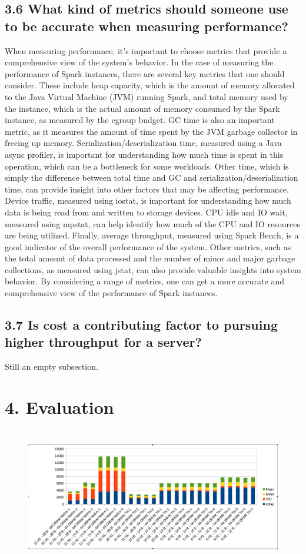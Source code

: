 \documentclass[twocolumn,10pt]{asme2e}
\begin{document}
\subsection*{3.6 What kind of metrics should someone use to be accurate when measuring performance?}
When measuring performance, it's important to choose metrics that provide a comprehensive view of the system's behavior. In the case of measuring the performance of Spark instances, there are several key metrics that one should consider. These include heap capacity, which is the amount of memory allocated to the Java Virtual Machine (JVM) running Spark, and total memory used by the instance, which is the actual amount of memory consumed by the Spark instance, as measured by the cgroup budget. GC time is also an important metric, as it measures the amount of time spent by the JVM garbage collector in freeing up memory. Serialization/deserialization time, measured using a Java async profiler, is important for understanding how much time is spent in this operation, which can be a bottleneck for some workloads. Other time, which is simply the difference between total time and GC and serialization/deserialization time, can provide insight into other factors that may be affecting performance. Device traffic, measured using iostat, is important for understanding how much data is being read from and written to storage devices. CPU idle and IO wait, measured using mpstat, can help identify how much of the CPU and IO resources are being utilized. Finally, average throughput, measured using Spark Bench, is a good indicator of the overall performance of the system. Other metrics, such as the total amount of data processed and the number of minor and major garbage collections, as measured using jstat, can also provide valuable insights into system behavior. By considering a range of metrics, one can get a more accurate and comprehensive view of the performance of Spark instances.

\subsection*{3.7 Is cost a contributing factor to pursuing higher throughput for a server?}
Still an empty subsection.

\section*{4. Evaluation}
\begin{figure}[h!]
	\includegraphics[width=12cm,height=6cm]{lr64.png}
\end{figure}
\end{document}
